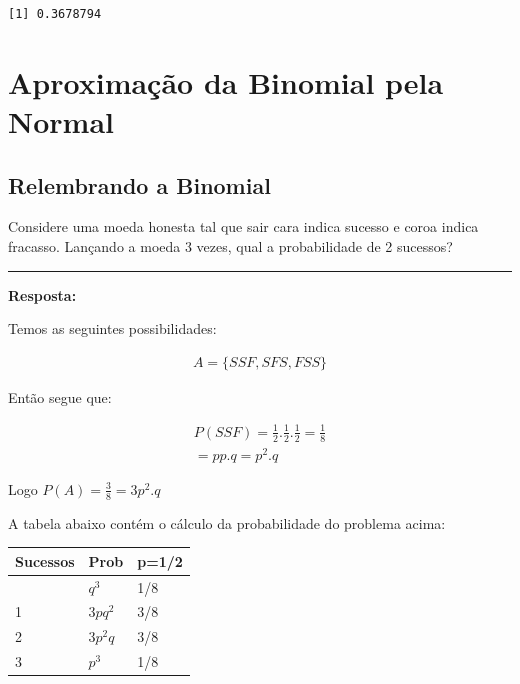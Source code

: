 \documentclass[
  letterpaper,
  DIV=11,
  numbers=noendperiod]{scrartcl}
\begin{document}
\begin{verbatim}
[1] 0.3678794
\end{verbatim}

\section{Aproximação da Binomial pela
Normal}\label{aproximauxe7uxe3o-da-binomial-pela-normal}

\subsection{Relembrando a Binomial}\label{relembrando-a-binomial}

\begin{exemplo}

Considere uma moeda honesta tal que sair cara indica sucesso e coroa
indica fracasso. Lançando a moeda 3 vezes, qual a probabilidade de 2
sucessos?

\begin{center}\rule{0.5\linewidth}{0.5pt}\end{center}

\textbf{Resposta:}

Temos as seguintes possibilidades:

\[\begin{array}{ccc}
A =\{SSF, SFS, FSS\}
\end{array}\]

Então segue que:

\[\begin{array}{ccc}
P(SSF)= \frac{1}{2}. \frac{1}{2}. \frac{1}{2} = \frac{1}{8}
\\
= p p . q = p^{2}. q
\end{array}\]

Logo \(P(A)=\frac{3}{8} = 3 p^{2}. q\)

\end{exemplo}

A tabela abaixo contém o cálculo da probabilidade do problema acima:

\begin{longtable}[]{@{}lll@{}}
\toprule\noalign{}
Sucessos & Prob & p=1/2 \\
\midrule\noalign{}
\endhead
\bottomrule\noalign{}
\endlastfoot
0 & \(q^{3}\) & 1/8 \\
1 & \(3pq^{2}\) & 3/8 \\
2 & \(3p^{2}q\) & 3/8 \\
3 & \(p^{3}\) & 1/8 \\
\end{longtable}
\end{document}
